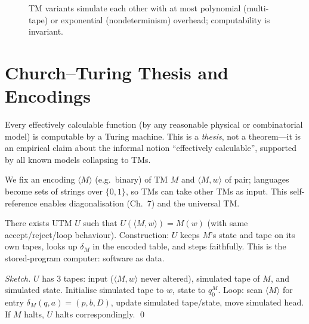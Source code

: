 \begin{figure}[h]
\centering
{}
\caption{TM variants simulate each other with at most polynomial (multi-tape) or exponential (nondeterminism) overhead; computability is invariant.}
\label{fig:tm-variants}
\end{figure}

\section{Church--Turing Thesis and Encodings}
\label{sec:church-turing}
\begin{definition}
Every effectively calculable function (by any reasonable physical or
combinatorial model) is computable by a Turing machine.
This is a \emph{thesis}, not a theorem---it is an empirical claim about
the informal notion ``effectively calculable'',
supported by all known models collapsing to TMs.
\end{definition}

We fix an encoding $\langle M\rangle$ (e.g.\ binary) of TM $M$ and $\langle M,w\rangle$ of pair; languages become sets of strings over $\{0,1\}$, so TMs can take other TMs as input. This self-reference enables diagonalisation (Ch.~7) and the universal TM.

\begin{theorem}[Universal TM]
There exists UTM $U$ such that $U(\langle M,w\rangle)=M(w)$ (with same accept/reject/loop behaviour). Construction: $U$ keeps $M$'s state and tape on its own tapes, looks up $\delta_M$ in the encoded table, and steps faithfully. This is the stored-program computer: software as data.
\end{theorem}
\begin{proof}[Sketch]
$U$ has $3$ tapes: input ($\langle M,w\rangle$ never altered), simulated tape of $M$, and simulated state. Initialise simulated tape to $w$, state to $q_0^M$. Loop: scan $\langle M\rangle$ for entry $\delta_M(q,a)=(p,b,D)$, update simulated tape/state, move simulated head. If $M$ halts, $U$ halts correspondingly. \qed
\end{proof}

